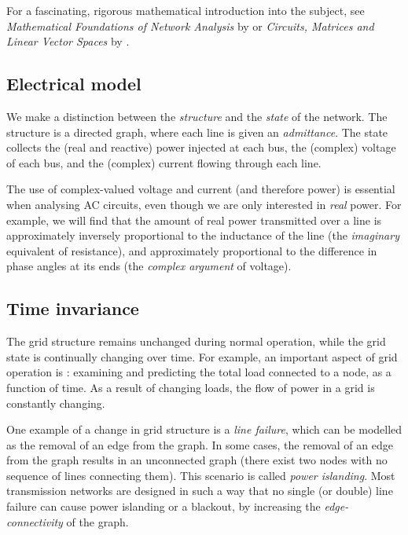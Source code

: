 \documentclass[main.tex]{subfiles}
\begin{document}
For a fascinating, rigorous mathematical introduction into the subject, see \emph{Mathematical Foundations of Network Analysis} by \cite{Slepian1968} or \emph{Circuits, Matrices and Linear Vector Spaces} by \cite{huelsman1963circuits}.

\subsection{Electrical model}
We make a distinction between the \emph{structure} and the \emph{state} of the network. The structure is a directed graph, where each line is given an \emph{admittance}. The state collects the (real and reactive) power injected at each bus, the (complex) voltage of each bus, and the (complex) current flowing through each line.

The use of complex-valued voltage and current (and therefore power) is essential when analysing AC circuits, even though we are only interested in \emph{real} power. For example, we will find that the amount of real power transmitted over a line is approximately inversely proportional to the inductance of the line (the \emph{imaginary} equivalent of resistance), and approximately proportional to the difference in phase angles at its ends (the \emph{complex argument} of voltage).

\subsection{Time invariance}
The grid structure remains unchanged during normal operation, while the grid state is continually changing over time. For example, an important aspect of grid operation is : examining and predicting the total load connected to a node, as a function of time. As a result of changing loads, the flow of power in a grid is constantly changing.

One example of a change in grid structure is a \emph{line failure}, which can be modelled as the removal of an edge from the graph. In some cases, the removal of an edge from the graph results in an unconnected graph (\ie there exist two nodes with no sequence of lines connecting them). This scenario is called \emph{power islanding}.
Most transmission networks are designed in such a way that no single (or double) line failure can cause power islanding or a blackout, by increasing the \emph{edge-connectivity} of the graph.
\end{document}
